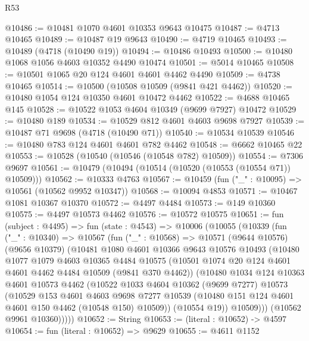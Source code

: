 \begin{lexlean}{R53}
\begin{coremodule}
@10486 := @10481 @1070 @4601 @10353 @9643 @10475
@10487 := @4713 @10465
@10489 := @10487 @19 @9643
@10490 := @4719 @10465
@10493 := @10489 (@4718 (@10490 @19))
@10494 := @10486 @10493
@10500 := @10480 @1068 @1056 @4603 @10352 @4490 @10474
@10501 := @5014 @10465
@10508 := @10501 @1065 @20 @124 @4601 @4601 @4462 @4490
@10509 := @4738 @10465
@10514 := @10500 (@10508 @10509 (@9841 @421 @4462))
@10520 := @10480 @1054 @124 @10350 @4601 @10472 @4462
@10522 := @4688 @10465 @145
@10528 := @10522 @1053 @4604 @10349 (@9699 @7927) @10472
@10529 := @10480 @189
@10534 := @10529 @812 @4601 @4603 @9698 @7927
@10539 := @10487 @71 @9698 (@4718 (@10490 @71))
@10540 := @10534 @10539
@10546 := @10480 @783 @124 @4601 @4601 @782 @4462
@10548 := @6662 @10465 @22
@10553 := @10528 (@10540 (@10546 (@10548 @782) @10509))
@10554 := @7306 @9697
@10561 := @10479 (@10494 (@10514 (@10520 (@10553 (@10554 @71)) @10509)))
@10562 := @10333 @4763
@10567 := @10459 (fun ("_" : @10095) => @10561 (@10562 @9952 @10347))
@10568 := @10094 @4853
@10571 := @10467 @1081 @10367 @10370
@10572 := @4497 @4484
@10573 := @149 @10360
@10575 := @4497 @10573 @4462
@10576 := @10572 @10575
@10651 := fun (subject : @4495) =>
  fun (state : @4543) =>
  @10006
    (@10055
      (@10339
        (fun ("_" : @10340) =>
        @10567
          (fun ("_" : @10568) =>
          @10571
            (@9644 @10576)
            (@9656 @10379)
            (@10481
              @1080
              @4601
              @10366
              @9643
              @10576
              @10493
              (@10480
                @1077
                @1079
                @4603
                @10365
                @4484
                @10575
                (@10501 @1074 @20 @124 @4601 @4601 @4462 @4484 @10509 (@9841 @370 @4462))
                (@10480
                  @1034
                  @124
                  @10363
                  @4601
                  @10573
                  @4462
                  (@10522
                    @1033
                    @4604
                    @10362
                    (@9699 @7277)
                    @10573
                    (@10529
                      @153
                      @4601
                      @4603
                      @9698
                      @7277
                      @10539
                      (@10480 @151 @124 @4601 @4601 @150 @4462 (@10548 @150) @10509))
                    (@10554 @19))
                  @10509)))
            (@10562 @9961 @10360)))))
@10652 := String
@10653 := (literal : @10652) -> @4597
@10654 := fun (literal : @10652) => @9629
@10655 := @4611 @1152

\end{coremodule}
\end{lexlean}
